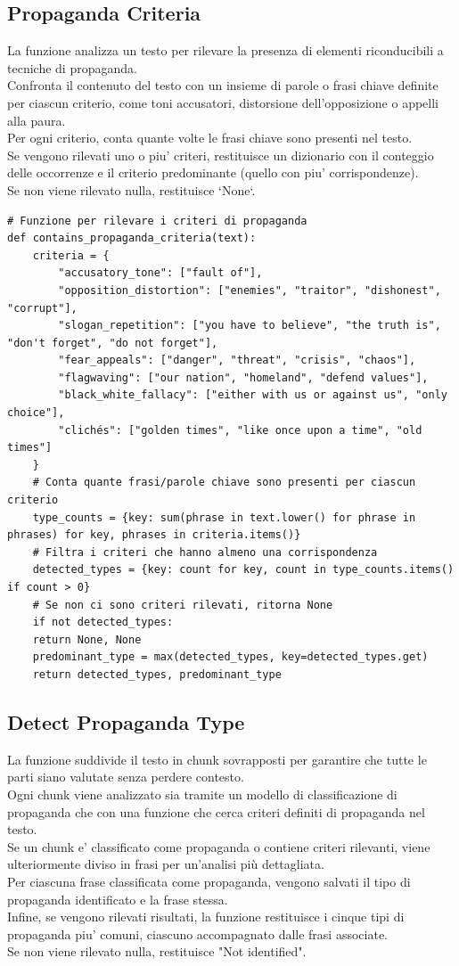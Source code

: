 \documentclass{article}
\begin{document}
		\subsection{Propaganda Criteria}
La funzione analizza un testo per rilevare la presenza di elementi riconducibili a tecniche di propaganda.\\ Confronta il contenuto del testo con un insieme di parole o frasi chiave definite per ciascun criterio, come toni accusatori, distorsione dell’opposizione o appelli alla paura. \\Per ogni criterio, conta quante volte le frasi chiave sono presenti nel testo. \\Se vengono rilevati uno o piu' criteri, restituisce un dizionario con il conteggio delle occorrenze e il criterio predominante (quello con piu' corrispondenze). \\Se non viene rilevato nulla, restituisce `None`.	
	\begin{lstlisting}
# Funzione per rilevare i criteri di propaganda
def contains_propaganda_criteria(text):
	criteria = {
		"accusatory_tone": ["fault of"],
		"opposition_distortion": ["enemies", "traitor", "dishonest", "corrupt"],
		"slogan_repetition": ["you have to believe", "the truth is", "don't forget", "do not forget"],
		"fear_appeals": ["danger", "threat", "crisis", "chaos"],
		"flagwaving": ["our nation", "homeland", "defend values"],
		"black_white_fallacy": ["either with us or against us", "only choice"],
		"clichés": ["golden times", "like once upon a time", "old times"]
	}
	# Conta quante frasi/parole chiave sono presenti per ciascun criterio
	type_counts = {key: sum(phrase in text.lower() for phrase in phrases) for key, phrases in criteria.items()}
	# Filtra i criteri che hanno almeno una corrispondenza
	detected_types = {key: count for key, count in type_counts.items() if count > 0}
	# Se non ci sono criteri rilevati, ritorna None
	if not detected_types:
	return None, None
	predominant_type = max(detected_types, key=detected_types.get)
	return detected_types, predominant_type
	\end{lstlisting}

		\subsection{Detect Propaganda Type}
La funzione suddivide il testo in chunk sovrapposti per garantire che tutte le parti siano valutate senza perdere contesto. \\ Ogni chunk viene analizzato sia tramite un modello di classificazione di propaganda che con una funzione che cerca criteri definiti di propaganda nel testo. \\ Se un chunk e' classificato come propaganda o contiene criteri rilevanti, viene ulteriormente diviso in frasi per un'analisi più dettagliata.\\
Per ciascuna frase classificata come propaganda, vengono salvati il tipo di propaganda identificato e la frase stessa. \\Infine, se vengono rilevati risultati, la funzione restituisce i cinque tipi di propaganda piu' comuni, ciascuno accompagnato dalle frasi associate. \\Se non viene rilevato nulla, restituisce "Not identified".	
\end{document}
